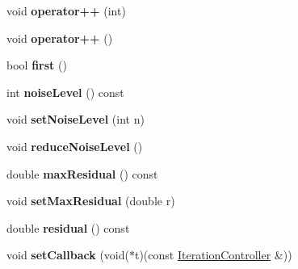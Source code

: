 \begin{DoxyCompactItemize}
void {\bfseries operator++} (int)
\item 
\mbox{\label{class_eigen_1_1_iteration_controller_a61e41184c8858f847d87a7dfb751c7f9}} 
void {\bfseries operator++} ()
\item 
\mbox{\label{class_eigen_1_1_iteration_controller_ae8d50bf180cbcf9f1201dfff5274aac5}} 
bool {\bfseries first} ()
\item 
\mbox{\label{class_eigen_1_1_iteration_controller_ab3e02d3d9f2c08ac9e41cfa93856e0ae}} 
int {\bfseries noise\+Level} () const
\item 
\mbox{\label{class_eigen_1_1_iteration_controller_a99621a09b56cf6edeb536302bddf6417}} 
void {\bfseries set\+Noise\+Level} (int n)
\item 
\mbox{\label{class_eigen_1_1_iteration_controller_a71470e89f1175fb5d0dbe13ba5a46656}} 
void {\bfseries reduce\+Noise\+Level} ()
\item 
\mbox{\label{class_eigen_1_1_iteration_controller_a4ef521c21a33a7f20213e690868f5dc8}} 
double {\bfseries max\+Residual} () const
\item 
\mbox{\label{class_eigen_1_1_iteration_controller_acba21ed80db5610a9a1f69dbd04a1c40}} 
void {\bfseries set\+Max\+Residual} (double r)
\item 
\mbox{\label{class_eigen_1_1_iteration_controller_af739b1bda26910c6fc19757832aff0f3}} 
double {\bfseries residual} () const
\item 
\mbox{\label{class_eigen_1_1_iteration_controller_a030a9ba60a60d970469bc21b0d687933}} 
void {\bfseries set\+Callback} (void($\ast$t)(const \hyperlink{class_eigen_1_1_iteration_controller}{Iteration\+Controller} \&))
\item 
\mbox{\label{class_eigen_1_1_iteration_controller_acc4ebc37c510ec0ba70af27ce9e51bb5}} 

\end{DoxyCompactItemize}
